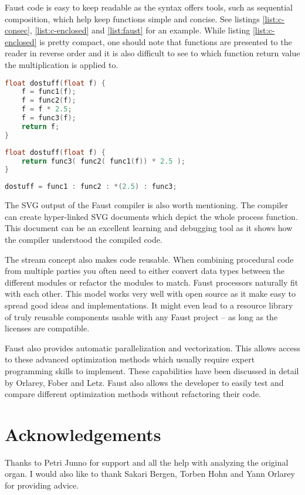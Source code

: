 \documentclass[11pt,a4paper]{article}
\begin{document}
Faust code is easy to keep readable as the syntax offers tools, such as sequential composition, which help keep functions simple and concise. See listings \ref{list:c-consec}, \ref{list:c-enclosed} and \ref{list:faust} for an example. While listing \ref{list:c-enclosed} is pretty compact, one should note that functions are presented to the reader in reverse order and it is also difficult to see to which function return value the multiplication is applied to.

\begin{lstlisting}[language=C,label=list:c-consec,caption=Consecutive calls]
float dostuff(float f) {
	f = func1(f);
	f = func2(f);
	f = f * 2.5;
	f = func3(f);
	return f;
}
\end{lstlisting}

\begin{lstlisting}[language=C,label=list:c-enclosed,caption=Enclosed statements]
float dostuff(float f) {
	return func3( func2( func1(f)) * 2.5 );
}
\end{lstlisting}

\begin{lstlisting}[language=C,label=list:faust,caption=Faust sequential composition]
dostuff = func1 : func2 : *(2.5) : func3;
\end{lstlisting}

The SVG output of the Faust compiler is also worth mentioning. The compiler can create hyper-linked SVG documents which depict the whole process function. This document can be an excellent learning and debugging tool as it shows how the compiler understood the compiled code.

The stream concept also makes code reusable. When combining procedural code from multiple parties you often need to either convert data types between the different modules or refactor the modules to match. Faust processors naturally fit with each other. This model works very well with open source as it make easy to spread good ideas and implementations. It might even lead to a resource library of truly reusable components usable with any Faust project -- as long as the licenses are compatible.

Faust also provides automatic parallelization and vectorization. This allows access to these advanced optimization methods which usually require expert programming skills to implement. These capabilities have been discussed in detail by Orlarey, Fober and Letz\cite{orlarey:09a}. Faust also allows the developer to easily test and compare different optimization methods without refactoring their code.

\section{Acknowledgements}

Thanks to Petri Junno for support and all the help with analyzing the original organ. I would also like to thank Sakari Bergen, Torben Hohn and Yann Orlarey for providing advice.



\end{document}
